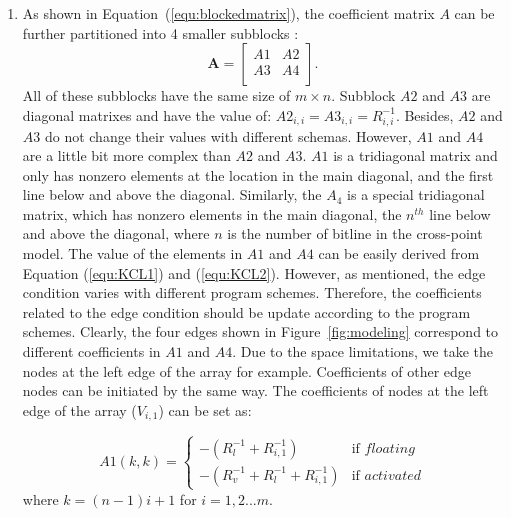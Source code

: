 \begin{enumerate}
  \item
  As shown in Equation~(\ref{equ:blockedmatrix}), the coefficient matrix $A$ can be further partitioned into 4 smaller subblocks :
    \begin{equation}\label{equ:blockedmatrix}
        \mathbf{A} = \left[
        \begin{array}{cc}
            A1 & A2  \\
            A3 & A4  \\
        \end{array} \right].
    \end{equation}
All of these subblocks have the same size of $m\times n$. Subblock $A2$ and $A3$ are diagonal matrixes and have the value of: $A2_{i,i} = A3_{i,i} = R_{i,i}^{-1}$. Besides, $A2$ and $A3$ do not change their values with different schemas. However, $A1$ and $A4$ are a little bit more complex than $A2$ and $A3$. $A1$ is a tridiagonal matrix and only has nonzero elements at the location in the main diagonal, and the first line below and above the diagonal. Similarly, the $A_4$ is a special tridiagonal matrix, which has nonzero elements in the main diagonal, the $n^{th}$ line below and above the diagonal, where $n$ is the number of bitline in the cross-point model.
The value of the elements in $A1$ and $A4$ can be easily derived from Equation (\ref{equ:KCL1}) and (\ref{equ:KCL2}). However, as mentioned, the edge condition varies with different program schemes. Therefore, the coefficients related to the edge condition should be update according to the program schemes. Clearly, the four edges shown in Figure~\ref{fig:modeling} correspond to different coefficients in $A1$ and $A4$. Due to the space limitations, we take the nodes at the left edge of the array for example. Coefficients of other edge nodes can be initiated by the same way. The coefficients of nodes at the left edge of the array ($V_{i,1}$) can be set as:


    \begin{equation}
    A1(k,k) = \left\{
    \begin{array}{ll}
    -(R_l^{-1}+R_{i,1}^{-1})   & \text{if } floating\\
    -(R_v^{-1}+R_l^{-1}+R_{i,1}^{-1})& \text{if } activated
    \end{array} \right.
    \end{equation}
    where $k=(n-1)i+1$ for $i=1,2...m$.


\end{enumerate}

